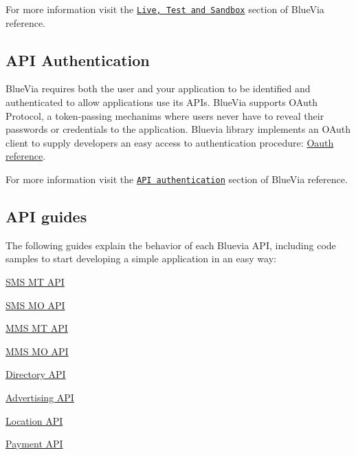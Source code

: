 For more information visit the \href{https://bluevia.com/en/knowledge/getStarted.Sandbox-and-Live-environments}{\tt Live, Test and Sandbox} section of BlueVia reference.\hypertarget{main_programming_guidelines_authentication}{}\subsection{API Authentication}\label{main_programming_guidelines_authentication}
BlueVia requires both the user and your application to be identified and authenticated to allow applications use its APIs. BlueVia supports OAuth Protocol, a token-\/passing mechanims where users never have to reveal their passwords or credentials to the application. Bluevia library implements an OAuth client to supply developers an easy access to authentication procedure: \hyperlink{blv_oauth_guide}{Oauth reference}.

For more information visit the \href{https://bluevia.com/en/knowledge/getStarted.Authentication}{\tt API authentication} section of BlueVia reference.\hypertarget{main_api_guides_sec}{}\subsection{API guides}\label{main_api_guides_sec}
The following guides explain the behavior of each Bluevia API, including code samples to start developing a simple application in an easy way:


\begin{DoxyItemize}
\item \hyperlink{blv_sms_mt_guide}{SMS MT API} 
\item \hyperlink{blv_sms_mo_guide}{SMS MO API} 
\item \hyperlink{blv_mms_mt_guide}{MMS MT API} 
\item \hyperlink{blv_mms_mo_guide}{MMS MO API} 
\item \hyperlink{blv_directory_guide}{Directory API} 
\item \hyperlink{blv_ad_guide}{Advertising API} 
\item \hyperlink{blv_location_guide}{Location API} 
\item \hyperlink{blv_payment_guide}{Payment API} 
\end{DoxyItemize}
